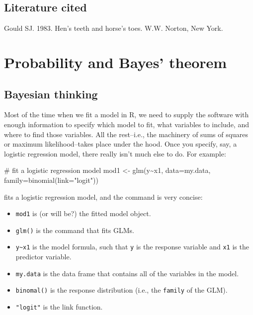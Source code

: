 \documentclass[
  13,
  letterpaper,
]{report}
\newenvironment{Shaded}{\begin{snugshade}}{\end{snugshade}}
\newcommand{\AttributeTok}[1]{\textcolor[rgb]{0.40,0.45,0.13}{#1}}
\newcommand{\CommentTok}[1]{\textcolor[rgb]{0.37,0.37,0.37}{#1}}
\newcommand{\FunctionTok}[1]{\textcolor[rgb]{0.28,0.35,0.67}{#1}}
\newcommand{\NormalTok}[1]{\textcolor[rgb]{0.00,0.23,0.31}{#1}}
\newcommand{\OtherTok}[1]{\textcolor[rgb]{0.00,0.23,0.31}{#1}}
\newcommand{\SpecialCharTok}[1]{\textcolor[rgb]{0.37,0.37,0.37}{#1}}
\newcommand{\StringTok}[1]{\textcolor[rgb]{0.13,0.47,0.30}{#1}}
\providecommand{\tightlist}{%
  \setlength{\itemsep}{0pt}\setlength{\parskip}{0pt}}
\begin{document}
\section{Literature cited}\label{literature-cited}

Gould SJ. 1983. Hen's teeth and horse's toes. W.W. Norton, New York.

\chapter{Probability and Bayes' theorem}\label{sec-bayes}

\section{Bayesian thinking}\label{bayesian-thinking}

Most of the time when we fit a model in R, we need to supply the
software with enough information to specify which model to fit, what
variables to include, and where to find those variables. All the
rest--i.e., the machinery of sums of squares or maximum
likelihood--takes place under the hood. Once you specify, say, a
logistic regression model, there really isn't much else to do. For
example:

\begin{Shaded}
\begin{Highlighting}[]
\CommentTok{\# fit a logistic regression model}
\NormalTok{mod1 }\OtherTok{\textless{}{-}} \FunctionTok{glm}\NormalTok{(y}\SpecialCharTok{\textasciitilde{}}\NormalTok{x1, }\AttributeTok{data=}\NormalTok{my.data, }\AttributeTok{family=}\FunctionTok{binomial}\NormalTok{(}\AttributeTok{link=}\StringTok{"logit"}\NormalTok{))}
\end{Highlighting}
\end{Shaded}

fits a logistic regression model, and the command is very concise:

\begin{itemize}
\tightlist
\item
  \texttt{mod1} is (or will be?) the fitted model object.
\item
  \texttt{glm()} is the command that fits GLMs.
\item
  \texttt{y\textasciitilde{}x1} is the model formula, such that
  \texttt{y} is the response variable and \texttt{x1} is the predictor
  variable.
\item
  \texttt{my.data} is the data frame that contains all of the variables
  in the model.
\item
  \texttt{binomal()} is the response distribution (i.e., the
  \texttt{family} of the GLM).
\item
  \texttt{"logit"} is the link function.
\end{itemize}
\end{document}
